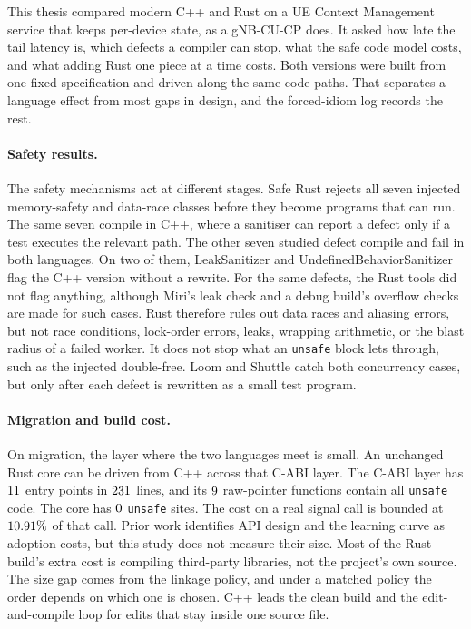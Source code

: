 \documentclass[english,oneside,a4paper,censored,csm,software-track-2020]{HYthesisML}
\begin{document}
This thesis compared modern C++ and Rust on a UE Context Management service
that keeps per-device state, as a gNB-CU-CP does. It asked how late the tail
latency is, which defects a compiler can stop, what the safe code model costs, and what
adding Rust one piece at a time costs. Both versions were built from one fixed
specification and driven along the same code paths. That separates a language effect from
most gaps in design, and the forced-idiom log records the rest.

\paragraph{Safety results.}
The safety mechanisms act at different stages. Safe Rust rejects all seven
injected memory-safety and data-race classes before they become programs that
can run. The same seven compile in C++, where a sanitiser can report a defect
only if a test executes the relevant path. The other seven studied defect compile and fail in
both languages. On two of them, LeakSanitizer and UndefinedBehaviorSanitizer
flag the C++ version without a rewrite. For the same defects, the Rust tools did not flag 
anything, although Miri's leak check and a debug build's overflow
checks are made for such cases. Rust therefore rules out data races and
aliasing errors, but not race conditions, lock-order errors, leaks, wrapping
arithmetic, or the blast radius of a failed worker. It does not stop what an
\texttt{unsafe} block lets through, such as the injected double-free. Loom and
Shuttle catch both concurrency cases, but only after each defect is rewritten as
a small test program.

\paragraph{Migration and build cost.}
On migration, the layer where the two languages meet is small. An unchanged
Rust core can be driven from C++ across that C-ABI layer. The
C-ABI layer has $11$ entry points in $231$ lines, and its
$9$ raw-pointer functions contain all \texttt{unsafe} code. The
core has $0$ \texttt{unsafe} sites. The cost on a real signal call is
bounded at $10.91\%$ of that call.
Prior work identifies API design and the learning curve as adoption costs, but
this study does not measure their size.
Most of the Rust build's extra cost is compiling third-party libraries, not the
project's own source. The size gap comes from the linkage policy, and under a
matched policy the order depends on which one is chosen. C++ leads the clean build and the
edit-and-compile loop for edits that stay inside one source file.
\end{document}
